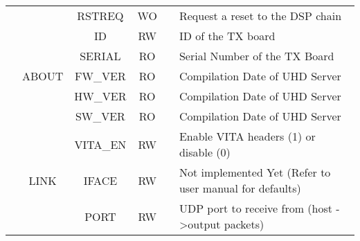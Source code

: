 \documentclass[11pt]{article}
\begin{document}
{\begin{landscape}
\begin{table}[H]
\begin{tabular}{|c|c|c|c|c|c|l|}
                       &                         & \multicolumn{2}{c|}{RSTREQ}        & WO                &             & Request a reset to the DSP chain                                      \\ \cline{2-7} 
                       & \multirow{5}{*}{ABOUT}  & \multicolumn{2}{c|}{ID}            & RW                &             & ID of the TX board                                                    \\ \cline{3-7} 
                       &                         & \multicolumn{2}{c|}{SERIAL}        & RO                &             & Serial Number of the TX Board                                         \\ \cline{3-7} 
                       &                         & \multicolumn{2}{c|}{FW\_VER}       & RO                &             & Compilation Date of UHD Server                                        \\ \cline{3-7} 
                       &                         & \multicolumn{2}{c|}{HW\_VER}       & RO                &             & Compilation Date of UHD Server                                        \\ \cline{3-7} 
                       &                         & \multicolumn{2}{c|}{SW\_VER}       & RO                &             & Compilation Date of UHD Server                                        \\ \cline{2-7} 
                       & \multirow{3}{*}{LINK}   & \multicolumn{2}{c|}{VITA\_EN}      & RW                &             & Enable VITA headers (1) or disable (0)                                \\ \cline{3-7} 
                       &                         & \multicolumn{2}{c|}{IFACE}         & RW                &             & Not implemented Yet (Refer to user manual for defaults)               \\ \cline{3-7} 
                       &                         & \multicolumn{2}{c|}{PORT}          & RW                &             & UDP port to receive from (host -\textgreater output packets)          \\ \hline
\end{tabular}
\end{table}


\end{landscape}}
\end{document}
